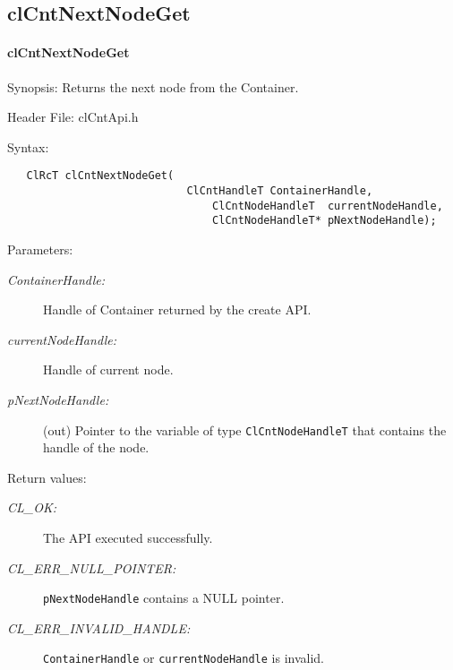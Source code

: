 \subsection{clCntNextNodeGet}
\hypertarget{pagecnt112}{}\paragraph{cl\-Cnt\-Next\-Node\-Get}\label{pagecnt112}
\begin{Desc}
\item[Synopsis:]Returns the next node from the Container.\end{Desc}
\begin{Desc}
\item[Header File:]clCntApi.h\end{Desc}
\begin{Desc}
\item[Syntax:]

\footnotesize\begin{verbatim}   ClRcT clCntNextNodeGet(
              				ClCntHandleT ContainerHandle,
                          		ClCntNodeHandleT  currentNodeHandle,
                          		ClCntNodeHandleT* pNextNodeHandle);
\end{verbatim}
\normalsize
\end{Desc}
\begin{Desc}
\item[Parameters:]
\begin{description}
\item[{\em Container\-Handle:}]Handle of Container returned by the create API. 
\item[{\em current\-Node\-Handle:}]Handle of current node. 
\item[{\em p\-Next\-Node\-Handle:}](out) Pointer to the variable of type {\tt{Cl\-Cnt\-Node\-Handle\-T}} that contains 
the handle of the node.
\end{description}
\end{Desc}
\begin{Desc}
\item[Return values:]
\begin{description}
\item[{\em CL\_\-OK:}]The API executed successfully. 
\item[{\em CL\_\-ERR\_\-NULL\_\-POINTER:}]{\tt{pNextNodeHandle}} contains a NULL pointer. 
\item[{\em CL\_\-ERR\_\-INVALID\_\-HANDLE:}]{\tt{ContainerHandle}} or {\tt{currentNodeHandle}} is invalid.
\end{description}
\end{Desc}
